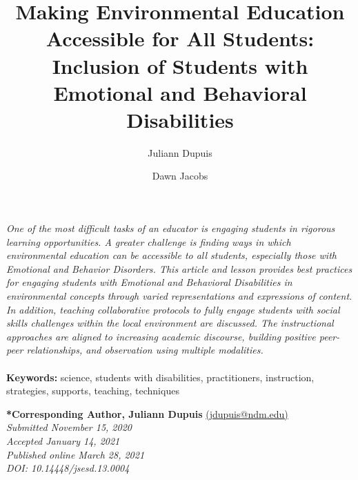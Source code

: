 \documentclass[11pt]{sig-alternate}
\makeatletter
\let\oldabstract\abstract
\let\oldendabstract\endabstract
\renewenvironment{abstract}
{\renewenvironment{quotation}%
               {\list{}{\addtolength{\leftmargin}{1em} %
                        \listparindent 1.5em%
                        \itemindent    \listparindent%
                        \rightmargin   \leftmargin%
                        \parsep        \z@ \@plus\p@}%
                \item\relax}%
               {\endlist}%
\oldabstract}
{\oldendabstract}
\makeatother
\begin{document}
\title{Making Environmental Education Accessible for All Students: Inclusion of Students with Emotional and Behavioral Disabilities}

\author[1]{\large \color{blue} Juliann Dupuis}
\author[2]{\large \color{blue} Dawn Jacobs}



\toappear{}

\maketitle
\begin{@twocolumnfalse} 

\begin{abstract}
\begin{large}
\item 
     \textit{One of the most difficult tasks of an educator is engaging students in rigorous learning opportunities. A greater challenge is finding ways in which environmental education can be accessible to all students, especially those with Emotional and Behavior Disorders.  This article and lesson provides best practices for engaging students with Emotional and Behavioral Disabilities in environmental concepts through varied representations and expressions of content. In addition, teaching collaborative protocols to fully engage students with social skills challenges within the local environment are discussed. The instructional approaches are aligned to increasing academic discourse, building positive peer-peer relationships, and observation using multiple modalities.}
     \\
     \\
    \textbf{Keywords:} science, students with disabilities, practitioners, instruction, strategies, supports, teaching, techniques
\end{large}
\end{abstract}
\end{@twocolumnfalse}



\textbf{*Corresponding Author, Juliann Dupuis} \href{mailto:jdupuis@ndm.edu}{(jdupuis@ndm.edu)} \\
\textit{Submitted November 15, 2020}\\
\textit{Accepted January 14, 2021} \\
\textit{Published online March 28, 2021} \\
\textit{DOI: 10.14448/jsesd.13.0004} \\
\end{document}
